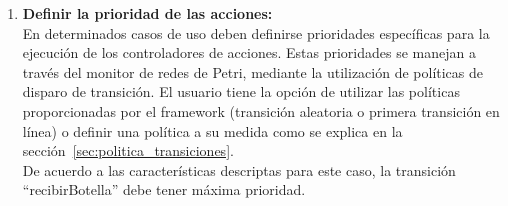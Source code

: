 \begin{enumerate}
\item \textbf{Definir la prioridad de las acciones:}\\
            En determinados casos de uso deben definirse prioridades específicas
            para la ejecución de los controladores de acciones. Estas
            prioridades se manejan a través del monitor de redes de Petri,
            mediante la utilización de políticas de disparo de transición. El
            usuario tiene la opción de utilizar las políticas proporcionadas por
            el framework (transición aleatoria o primera transición en línea) o
            definir una política a su medida como se explica en la
            sección~\ref{sec:politica_transiciones}. \\
            De acuerdo a las características descriptas para este caso, la transición
            ``recibirBotella'' debe tener máxima prioridad.


\end{enumerate}
